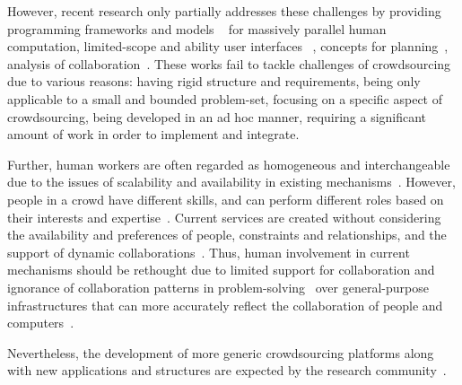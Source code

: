 However, recent research only partially addresses these challenges by 
providing programming frameworks and models
~\cite{Kittur2011, Ahmad2011, Kokciyan2012, Little2009, Minder2011, Barowy2012, Kulkarni2012, Kittur2012} 
for massively parallel human computation, limited-scope and ability user interfaces
~\cite{Marcus2011, Bernstein2010, Marcus2011b, Rzeszotarski2012}, 
concepts for planning~\cite{Zhang2012}, 
analysis of collaboration~\cite{Dorn2012}. 
These works fail to tackle challenges of crowdsourcing due to various reasons: 
having rigid structure and requirements, being only applicable to a small and 
bounded problem-set, focusing on a specific aspect of crowdsourcing, 
being developed in an ad hoc manner, requiring a significant amount of work in 
order to implement and integrate.


Further, human workers are often regarded as homogeneous and 
interchangeable due to the issues of scalability and availability in existing 
mechanisms~\cite{Ahmad2011}. However, people in a crowd have different 
skills, and can perform different roles based on their interests and expertise~\cite{Zhang2011}. 
Current services are created without considering the availability and preferences of 
people, constraints and relationships, and the support of dynamic 
collaborations~\cite{Schall2010}. Thus, human involvement in current mechanisms should 
be rethought due to limited support for collaboration and 
ignorance of collaboration patterns in problem-solving~\cite{Dorn2012a} 
over general-purpose infrastructures that can more accurately reflect 
the collaboration of people and computers~\cite{Minder2012, Bernstein2012}.


 
Nevertheless, the development of more generic crowdsourcing platforms 
along with new applications and structures are expected 
by the research community~\cite{Doan2011}.


